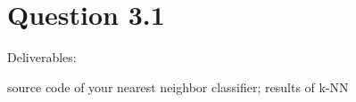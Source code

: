 \section*{Question 3.1}
Deliverables: 

source code of your nearest neighbor classifier; results of k-NN

